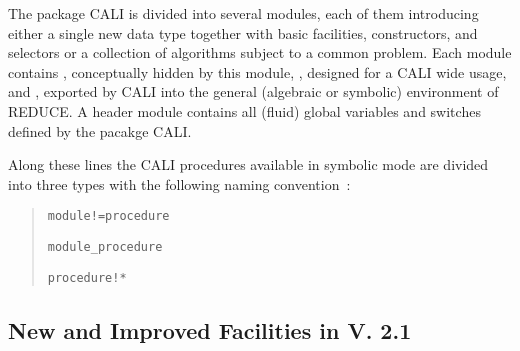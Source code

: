 The package CALI is divided into several modules, each of them
introducing either a single new data type together with basic
facilities, constructors, and selectors or a collection of algorithms
subject to a common problem. Each module contains , conceptually hidden by this module, , designed for a CALI wide usage, and , exported by CALI into the general (algebraic or
symbolic) environment of REDUCE. A header module  contains
all (fluid) global variables and switches defined by the pacakge
CALI.

Along these lines the CALI procedures available in symbolic mode are
divided into three types with the following naming convention~:
\begin{quote}
\verb|module!=procedure| 


\verb|module_procedure| 


\verb|procedure!*| 

\end{quote}

\subsection{New and Improved Facilities in V. 2.1}


